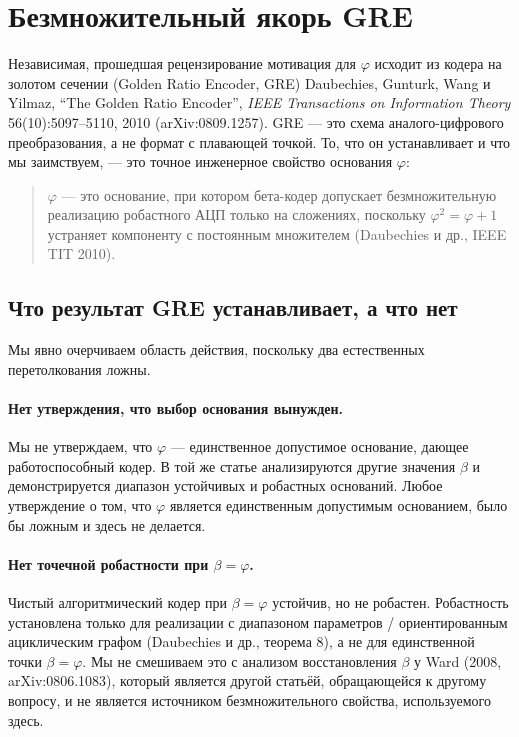 \documentclass[11pt,a4paper]{article}
\theoremstyle{plain}
\begin{document}
\section{Безмножительный якорь GRE}\label{sec:gre}

Независимая, прошедшая рецензирование мотивация для \(\varphi\) исходит из
кодера на золотом сечении (Golden Ratio Encoder, GRE) Daubechies, Gunturk, Wang
и Yilmaz, ``The Golden Ratio Encoder'', \emph{IEEE Transactions on Information
Theory} 56(10):5097--5110, 2010 (arXiv:0809.1257). GRE --- это схема
аналого-цифрового преобразования, а не формат с плавающей точкой. То, что он
устанавливает и что мы заимствуем, --- это точное инженерное свойство основания
\(\varphi\):

\begin{quote}
\(\varphi\) --- это основание, при котором бета-кодер допускает безмножительную
реализацию робастного АЦП только на сложениях, поскольку
\(\varphi^{2} = \varphi + 1\) устраняет компоненту с постоянным множителем
(Daubechies и др., IEEE TIT 2010).
\end{quote}

\subsection{Что результат GRE устанавливает, а что нет}

Мы явно очерчиваем область действия, поскольку два естественных перетолкования
ложны.

\paragraph{Нет утверждения, что выбор основания вынужден.}
Мы не утверждаем, что \(\varphi\) --- единственное допустимое основание,
дающее работоспособный кодер. В той же статье анализируются другие значения
\(\beta\) и демонстрируется диапазон устойчивых и робастных оснований. Любое
утверждение о том, что \(\varphi\) является единственным допустимым основанием,
было бы ложным и здесь не делается.

\paragraph{Нет точечной робастности при \(\beta = \varphi\).}
Чистый алгоритмический кодер при \(\beta = \varphi\) устойчив, но не робастен.
Робастность установлена только для реализации с диапазоном параметров /
ориентированным ациклическим графом (Daubechies и др., теорема 8), а не для
единственной точки \(\beta = \varphi\). Мы не смешиваем это с анализом
восстановления \(\beta\) у Ward (2008, arXiv:0806.1083), который является
другой статьёй, обращающейся к другому вопросу, и не является источником
безмножительного свойства, используемого здесь.
\end{document}
